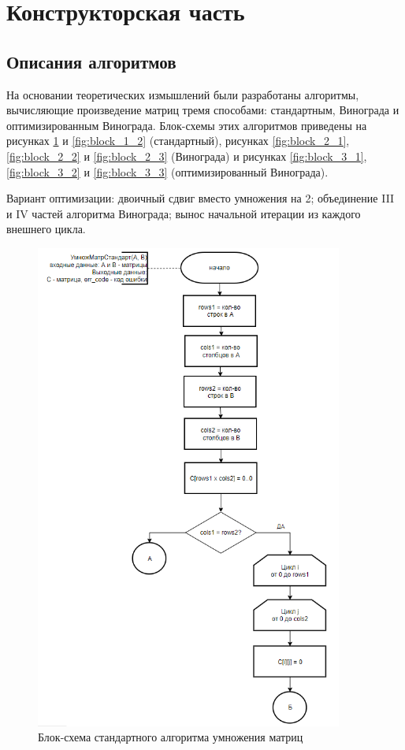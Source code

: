 \section{Конструкторская часть}
\subsection{Описания алгоритмов}

\hspace{1.25cm}
На основании теоретических измышлений были разработаны алгоритмы, вычисляющие произведение матриц тремя способами: стандартным, Винограда и оптимизированным Винограда. Блок-схемы этих алгоритмов приведены на рисунках \ref{fig:block_1_1} и \ref{fig:block_1_2} (стандартный), рисунках \ref{fig:block_2_1}, \ref{fig:block_2_2} и \ref{fig:block_2_3} (Винограда) и рисунках \ref{fig:block_3_1}, \ref{fig:block_3_2} и \ref{fig:block_3_3} (оптимизированный Винограда).

Вариант оптимизации: двоичный сдвиг вместо умножения на 2; объединение III и IV частей алгоритма Винограда; вынос начальной итерации из каждого внешнего цикла.

\begin{figure}[H]
    \centering
    \includegraphics[width=0.9\textwidth]{img/block_1_1.png}
    \caption{Блок-схема стандартного алгоритма умножения матриц}
    \label{fig:block_1_1}
\end{figure}


